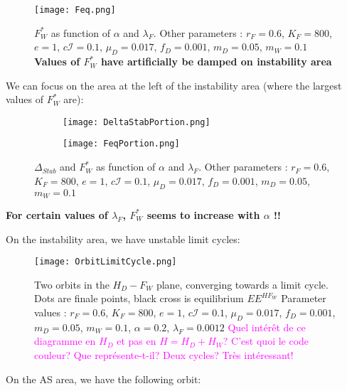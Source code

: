 \documentclass{article}
\newcommand{\lfw}{\lambda_{F}}
\newcommand{\lfw}{\lambda_{F}}
\newcommand{\YD}[1]{\textcolor{magenta}{#1}}
\begin{document}
\newpage
\begin{figure}[!ht]
\centering
\texttt{[image: Feq.png]}
\caption{\centering $F^*_W$ as function of $\alpha$ and $\lfw$. \newline
Other parameters : $r_F = 0.6$, $K_F = 800$, $e=1$, $c\mathcal{I} = 0.1$, $\mu_D = 0.017$, $f_D = 0.001$, $m_D = 0.05$, $m_W = 0.1$ \newline
\textbf{Values of $F^*_W$ have artificially be damped on instability area}}
\end{figure}

\newpage
We can focus on the area at the left of the instability area (where the largest values of $F^*_W$ are):

\begin{figure}[!ht]
\centering
\begin{subfigure}[b]{1\textwidth}
\texttt{[image: DeltaStabPortion.png]}
\end{subfigure}
\begin{subfigure}[b]{1\textwidth}
\texttt{[image: FeqPortion.png]}
\end{subfigure}
\caption{\centering $\Delta_{Stab}$ and $F^*_W$ as function of $\alpha$ and $\lfw$. \newline
Other parameters : $r_F = 0.6$, $K_F = 800$, $e=1$, $c\mathcal{I} = 0.1$, $\mu_D = 0.017$, $f_D = 0.001$, $m_D = 0.05$, $m_W = 0.1$}
\end{figure}

\textbf{For certain values of $\lfw$, $F^*_W$ seems to increase with $\alpha$ !!}

On the instability area, we have unstable limit cycles:

\begin{figure}[!ht]
\centering
\texttt{[image: OrbitLimitCycle.png]}
\caption{\centering Two orbits in the $H_D - F_W$ plane, converging towards a limit cycle. Dots are finale points, black cross is equilibrium $EE^{HF_W}$ \newline
Parameter values : $r_F = 0.6$, $K_F = 800$, $e=1$, $c\mathcal{I} = 0.1$, $\mu_D = 0.017$, $f_D = 0.001$, $m_D = 0.05$, $m_W = 0.1$, $\alpha = 0.2$, $\lfw = 0.0012$
\YD{Quel intérêt de ce diagramme en $H_D$ et pas en $H=H_D+H_W$? C'est quoi le code couleur? Que représente-t-il? Deux cycles? Très intéressant!}}
\end{figure}

\newpage
On the AS area, we have the following orbit:
\end{document}
